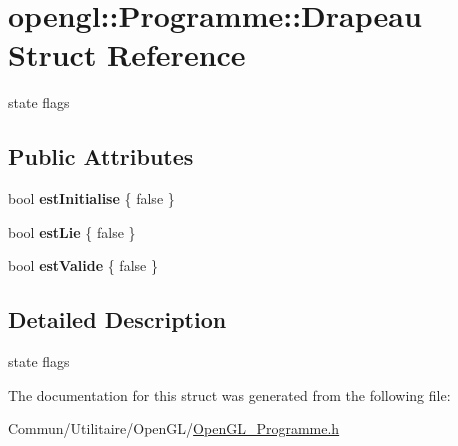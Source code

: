 \hypertarget{structopengl_1_1_programme_1_1_drapeau}{}\section{opengl\+:\+:Programme\+:\+:Drapeau Struct Reference}
\label{structopengl_1_1_programme_1_1_drapeau}


state flags  


\subsection*{Public Attributes}
\begin{DoxyCompactItemize}
\item 
bool {\bfseries est\+Initialise} \{ false \}\hypertarget{structopengl_1_1_programme_1_1_drapeau_a12905aafa461c2eb31e0b9cce382fb73}{}\label{structopengl_1_1_programme_1_1_drapeau_a12905aafa461c2eb31e0b9cce382fb73}

\item 
bool {\bfseries est\+Lie} \{ false \}\hypertarget{structopengl_1_1_programme_1_1_drapeau_af145b3e05889f0b9c4b2dac99a9aaebe}{}\label{structopengl_1_1_programme_1_1_drapeau_af145b3e05889f0b9c4b2dac99a9aaebe}

\item 
bool {\bfseries est\+Valide} \{ false \}\hypertarget{structopengl_1_1_programme_1_1_drapeau_a286886e002eac3275ac333aaef635cca}{}\label{structopengl_1_1_programme_1_1_drapeau_a286886e002eac3275ac333aaef635cca}

\end{DoxyCompactItemize}


\subsection{Detailed Description}
state flags 

The documentation for this struct was generated from the following file\+:\begin{DoxyCompactItemize}
\item 
Commun/\+Utilitaire/\+Open\+G\+L/\hyperlink{_open_g_l___programme_8h}{Open\+G\+L\+\_\+\+Programme.\+h}\end{DoxyCompactItemize}
